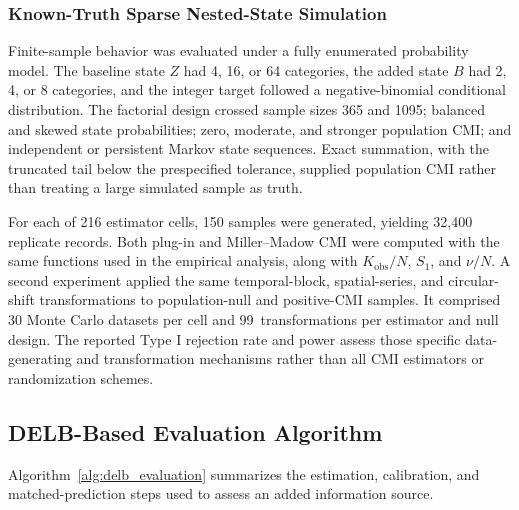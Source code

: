 \documentclass[applsci,article,accept,moreauthors]{Definitions/mdpi}
\def\hl#1{#1}%
\begin{document}
\subsubsection*{Known-Truth Sparse Nested-State Simulation}
\label{subsec:e12_simulation_methods}

Finite-sample behavior was evaluated under a fully enumerated probability
model. The baseline state \(Z\) had 4, 16, or 64 categories, the added state
\(B\) had 2, 4, or 8 categories, and the integer target followed a
negative-binomial conditional distribution. The factorial design crossed
sample sizes 365 and 1095; balanced and skewed state probabilities; zero,
moderate, and stronger population CMI; and independent or persistent Markov
state sequences. Exact summation, with the truncated tail below the
prespecified tolerance, supplied population CMI rather than treating a
large simulated sample as truth.

For each of 216 estimator cells, 150 samples were generated, yielding
32,400 replicate records. Both plug-in and Miller--Madow CMI were computed
with the same functions used in the empirical analysis, along with
\(K_{\mathrm{obs}}/N\), \(S_1\), and \(\nu/N\). A second experiment applied
the same temporal-block, spatial-series, and circular-shift transformations
to population-null and positive-CMI samples. It comprised 30 Monte Carlo
datasets per cell and 99~transformations per estimator and null design.
The reported Type I rejection rate and power assess those
specific data-generating and transformation mechanisms rather than all CMI
estimators or randomization schemes.

\subsection{DELB-Based Evaluation Algorithm}
\label{subsec:delb_evaluation_algorithm}

\hl{Algorithm}~\ref{alg:delb_evaluation} \hl{summarizes the estimation, calibration, and matched-prediction steps used to assess an added information source.}
\end{document}
